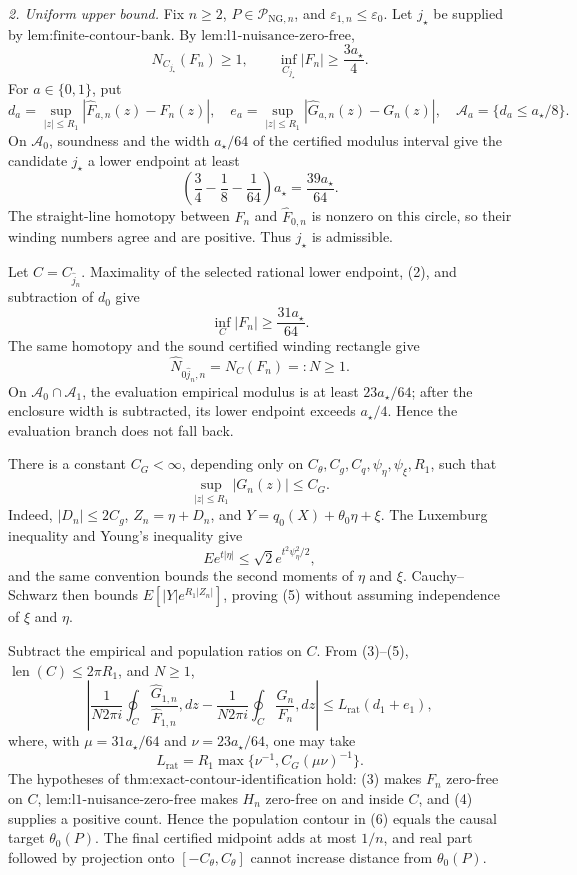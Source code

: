 \emph{2. Uniform upper bound.}  Fix \(n\ge2\), \(P\in\mathcal P_{\mathrm{NG},n}\), and \(\varepsilon_{1,n}\le\varepsilon_0\).  Let \(j_{\star}\) be supplied by \(\text{lem:finite-contour-bank}\).  By \(\text{lem:l1-nuisance-zero-free}\),
\[
 N_{C_{j_{\star}}}(F_n)\ge1,
 \qquad
 \inf_{C_{j_{\star}}}|F_n|\ge\frac{3a_{\star}}4. \tag{1}
\]
For \(a\in\{0,1\}\), put
\[
 d_a=\sup_{|z|\le R_1}|\widehat F_{a,n}(z)-F_n(z)|,
 \quad
 e_a=\sup_{|z|\le R_1}|\widehat G_{a,n}(z)-G_n(z)|,
 \quad
 \mathcal A_a=\{d_a\le a_{\star}/8\}.
\]
On \(\mathcal A_0\), soundness and the width \(a_{\star}/64\) of the certified modulus interval give the candidate \(j_{\star}\) a lower endpoint at least
\[
 \left(\frac34-\frac18-\frac1{64}\right)a_{\star}
 =\frac{39a_{\star}}{64}. \tag{2}
\]
The straight-line homotopy between \(F_n\) and \(\widehat F_{0,n}\) is nonzero on this circle, so their winding numbers agree and are positive.  Thus \(j_{\star}\) is admissible.

Let \(C=C_{\widehat j_n}\).  Maximality of the selected rational lower endpoint, (2), and subtraction of \(d_0\) give
\[
 \inf_C|F_n|\ge\frac{31a_{\star}}{64}. \tag{3}
\]
The same homotopy and the sound certified winding rectangle give
\[
 \widehat N_{0\widehat j_n,n}=N_C(F_n)=:N\ge1. \tag{4}
\]
On \(\mathcal A_0\cap\mathcal A_1\), the evaluation empirical modulus is at least \(23a_{\star}/64\); after the enclosure width is subtracted, its lower endpoint exceeds \(a_{\star}/4\).  Hence the evaluation branch does not fall back.

There is a constant \(C_G<\infty\), depending only on \(C_{\theta},C_g,C_q,\psi_{\eta},\psi_{\xi},R_1\), such that
\[
 \sup_{|z|\le R_1}|G_n(z)|\le C_G. \tag{5}
\]
Indeed, \(|D_n|\le2C_g\), \(Z_n=\eta+D_n\), and \(Y=q_0(X)+\theta_0\eta+\xi\).  The Luxemburg inequality and Young's inequality give
\[
 E e^{t|\eta|}\le\sqrt2e^{t^2\psi_{\eta}^2/2},
\]
and the same convention bounds the second moments of \(\eta\) and \(\xi\).  Cauchy--Schwarz then bounds \(E[|Y|e^{R_1|Z_n|}]\), proving (5) without assuming independence of \(\xi\) and \(\eta\).

Subtract the empirical and population ratios on \(C\).  From (3)--(5), \(\operatorname{len}(C)\le2\pi R_1\), and \(N\ge1\),
\[
 \left|
 \frac1{N2\pi i}\oint_C\frac{\widehat G_{1,n}}{\widehat F_{1,n}},dz
 -\frac1{N2\pi i}\oint_C\frac{G_n}{F_n},dz
 \right|
 \le L_{\mathrm{rat}}(d_1+e_1), \tag{6}
\]
where, with \(\mu=31a_{\star}/64\) and \(\nu=23a_{\star}/64\), one may take
\[
 L_{\mathrm{rat}}=R_1\max\{\nu^{-1},C_G(\mu\nu)^{-1}\}. \tag{7}
\]
The hypotheses of \(\text{thm:exact-contour-identification}\) hold: (3) makes \(F_n\) zero-free on \(C\), \(\text{lem:l1-nuisance-zero-free}\) makes \(H_n\) zero-free on and inside \(C\), and (4) supplies a positive count.  Hence the population contour in (6) equals the causal target \(\theta_0(P)\).  The final certified midpoint adds at most \(1/n\), and real part followed by projection onto \([-C_{\theta},C_{\theta}]\) cannot increase distance from \(\theta_0(P)\).

